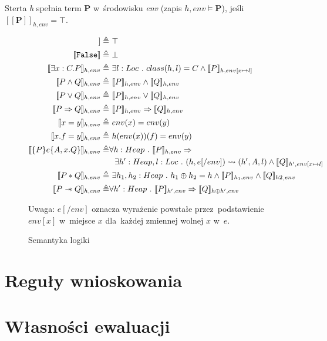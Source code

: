 \documentclass[]{pracamgr}
\newcommand \wand {\mathrel{-\mkern-6mu*}}
\newcommand \outerP {\mathbf{P}}
\newcommand \hoare [5] {\{#1\}#2\{#3,#4.#5\}}
\renewcommand \| {\hspace{0.75em} | \hspace{0.75em} }
\renewcommand \[ {[\![}
\renewcommand \] {]\!]}
\begin{document}
Sterta \textit{h} spełnia term $\outerP$ w~środowisku \textit{env} (zapis $h, env \models \outerP $),
jeśli $\[ \outerP \]_{h, env} = \top$.

\begin{figure}
\begin{align*}
 \[ \texttt{True} \] \triangleq & \ \top \\
 \[ \texttt{False} \] \triangleq & \ \bot \\
 \[ \exists x : C . P \]_{h, env} \triangleq & \ \exists l : Loc\ .\ class(h, l) = C \wedge
    \[ P \]_{h, env[x \mapsto l]}  \\
 \[ P \wedge Q \]_{h, env} \triangleq & \ \[ P \]_{h, env} \wedge \[ Q \]_{h, env} \\
 \[ P \vee Q \]_{h, env} \triangleq & \ \[ P \]_{h, env} \vee \[ Q \]_{h, env} \\
 \[ P \Rightarrow Q \]_{h, env} \triangleq & \ \[ P \]_{h, env} \Rightarrow \[ Q \]_{h, env} \\
 \[ x = y \]_{h, env} \triangleq & \ env(x) = env(y) \\
 \[ x.f = y \]_{h, env} \triangleq & \ h(env(x))(f) = env(y) \\
 \[ \hoare{P}{e}{A}{x}{Q} \]_{h, env} \triangleq & \forall h : Heap \ . \ \[ P \]_{h, env} \Rightarrow \\
      & \ \  \exists h' : Heap, l : Loc \ . \ (h, e[/env]) \leadsto (h', A, l) \wedge
      \[ Q \]_{h', env[x \mapsto l]}  \\
 \[ P * Q \]_{h, env} \triangleq & \ \exists h_1,h_2 : Heap\ .\ h_1 \oplus h_2 = h \wedge
    \[ P \]_{h_1, env} \wedge \[ Q \]_{h2_, env}  \\
 \[ P \wand Q \]_{h, env} \triangleq & \forall h' : Heap \ . \ \[ P \]_{h', env} \Rightarrow \[ Q \]_{h \oplus h', env}
\end{align*}

Uwaga: $e[/env]$ oznacza wyrażenie powstałe przez~podstawienie $env[x]$ w~miejsce $x$ dla~każdej zmiennej
wolnej $x$ w~$e$.

\caption{Semantyka logiki}
\label{fig:sematics}
\end{figure}

\chapter{Reguły wnioskowania}

\chapter{Własności ewaluacji}
\end{document}
